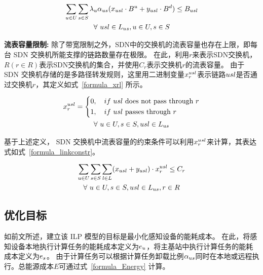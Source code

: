 \begin{equation}
\label{formula_Bandwidth}
\begin{gathered}
\sum\limits_{u \in U} \sum\limits_{s\in S}{\lambda}_{u}{\alpha}_{us}(x_{usl} \cdot B^{u} + y_{usl} \cdot B^{d}) \leq B_{usl}\\
\forall \ usl\in L_{us}, u\in U, s\in S\\
\end{gathered}
\end{equation}

\textbf{流表容量限制:}
除了带宽限制之外，SDN中的交换机的流表容量也存在上限，即每台 SDN 交换机所能支撑的链路数量存在极限。
在此，利用$r$来表示SDN交换机，$R (r \in R)$表示SDN交换机的集合，并使用$C_r$表示交换机$r$的流表容量。
由于 SDN 交换机存储的是多路径转发规则，这里用二进制变量$x^{usl}_{r}$表示链路$usl$是否通过交换机$r$，其定义如式~\eqref{formula_xrl} 所示。

\begin{equation}
\label{formula_xrl}
\begin{gathered}
\begin{aligned}
x^{usl}_{r} = \left\{\begin{aligned}
& 0,\quad if\ usl \text{ does not pass through }r\\
& 1,\quad if\ usl \text{ passes through }r\\
\end{aligned}
\right.
\end{aligned}
\\\forall \ u \in U, s \in S, usl\in L_{us}\\
\end{gathered}
\end{equation}

基于上述定义， SDN 交换机中流表容量的约束条件可以利用$x^{usl}_{r}$来计算，其表达式如式~\eqref{formula_linkconstr}。

\begin{equation}
\label{formula_linkconstr}
\begin{gathered}
\sum\limits_{u \in U}\sum\limits_{s \in S}\sum\limits_{l \in L}(x_{usl} + y_{usl}) \cdot x^{usl}_{r} \leq C_r\\
\forall\ u \in U, s \in S, usl\in L_{us}, r\in R\\
\end{gathered}
\end{equation}

\subsection{优化目标}
如前文所述，建立该 ILP 模型的目标是最小化感知设备的能耗成本。
在此，将感知设备本地执行计算任务的能耗成本定义为$e_u$，将主基站中执行计算任务的能耗成本定义为$e_s$。
由于计算任务可以根据计算任务卸载比例${\alpha}_{us}$同时在本地或远程执行。总能源成本$E$可通过式~\eqref{formula_Energy} 计算。

